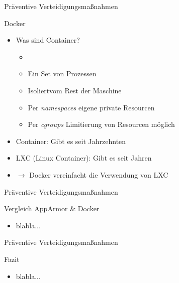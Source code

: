 \begin{frame}{Präventive Verteidigungsmaßnahmen}
        \begin{block}{Docker}
                \begin{itemize}
                        \item Was sind Container?
                        \pause
                        \begin{itemize}
                                \item \textbf{}
                                \pause
                                \item Ein Set von Prozessen
                                \pause
                                \item Isoliert\footnotemark vom Rest der Maschine
                                \pause
                                \item Per \textit{namespaces} eigene private Resourcen
                                \pause
                                \item Per \textit{cgroups} Limitierung von Resourcen möglich
                        \end{itemize}
                        \pause
                        \item Container: Gibt es seit Jahrzehnten
                        \pause
                        \item LXC (Linux Container): Gibt es seit Jahren
                        \pause
                        \item $\rightarrow$ Docker vereinfacht die Verwendung von LXC 
                \end{itemize}
        \end{block}

\end{frame}

\begin{frame}{Präventive Verteidigungsmaßnahmen}
        \begin{block}{Vergleich AppArmor \& Docker}
                \begin{itemize}
                        \item blabla... 
                \end{itemize}
        \end{block}
\end{frame}

\begin{frame}{Präventive Verteidigungsmaßnahmen}
        \begin{block}{Fazit}
                \begin{itemize}
                        \item blabla... 
                \end{itemize}
        \end{block}
\end{frame}


